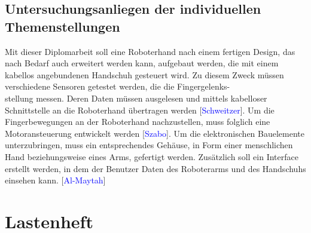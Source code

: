 \documentclass[titlepage,12pt,twoside]{article}
\begin{document}
\subsection{Untersuchungsanliegen der individuellen Themenstellungen}
\label{chap:Untersuchungsanliegen der individuellen Themenstellungen}
Mit dieser Diplomarbeit soll eine Roboterhand nach einem fertigen Design, das nach Bedarf auch erweitert werden kann, aufgebaut werden,
die mit einem kabellos angebundenen Handschuh gesteuert wird. Zu diesem Zweck müssen
verschiedene Sensoren getestet werden, die die Fingergelenks-\\stellung messen. Deren Daten
müssen ausgelesen und mittels kabelloser Schnittstelle an die Roboterhand übertragen werden
[\textcolor{blue}{Schweitzer}]. Um die Fingerbewegungen an der Roboterhand nachzustellen, muss folglich eine
Motoransteuerung entwickelt werden [\textcolor{blue}{Szabo}]. Um die elektronischen Bauelemente
unterzubringen, muss ein entsprechendes Gehäuse, in Form einer menschlichen Hand
beziehungsweise eines Arms, gefertigt werden. Zusätzlich soll ein Interface erstellt werden, in
dem der Benutzer Daten des Roboterarms und des Handschuhs einsehen kann. [\textcolor{blue}{Al-Maytah}] \\

\newpage
\section{Lastenheft}
\label{chap:Lastenheft}
\end{document}
